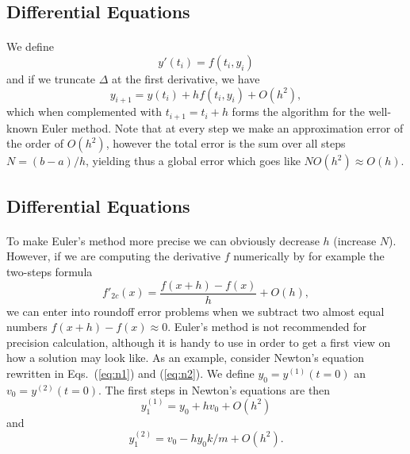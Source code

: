 \documentclass[%
oneside,                 %
final,                   %
10pt]{article}
\begin{document}
\subsection{Differential Equations}

\paragraph{}
We define 
\begin{equation}
  y'(t_i)=f(t_i,y_i)   
\end{equation}
and if we truncate $\Delta$ at the first derivative, we have
\begin{equation}
   y_{i+1}=y(t_i) + hf(t_i,y_i) + O(h^2), \label{eq:euler}
\end{equation}
which when complemented with $t_{i+1}=t_i+h$ forms
the algorithm for the well-known Euler method. 
Note that at every step we make an approximation error
of the order of $O(h^2)$, however the total error is the sum over all
steps $N=(b-a)/h$, yielding thus a global error which goes like
$NO(h^2)\approx O(h)$.



\subsection{Differential Equations}

\paragraph{}
To make Euler's method more precise we can obviously
decrease $h$ (increase $N$). However, if we are computing the 
derivative $f$ numerically  
by for example the two-steps formula
\[
    f'_{2c}(x)= \frac{f(x+h)-f(x)}{h}+O(h),
\]
we can enter into roundoff error problems when we subtract 
two almost equal numbers $f(x+h)-f(x)\approx 0$. 
Euler's method is not recommended for precision calculation,
although it is handy to use in order to get a first
view on how a solution may look like. As an example,
consider Newton's equation rewritten in Eqs.~(\ref{eq:n1}) and (\ref{eq:n2}). We define $y_0=y^{(1)}(t=0)$
an $v_0=y^{(2)}(t=0)$. The first steps in Newton's equations
are then
\begin{equation} 
   y^{(1)}_1=y_0+hv_0+O(h^2)
\end{equation}
and 
\begin{equation}
      y^{(2)}_1=v_0-hy_0k/m+O(h^2).
\end{equation}
\end{document}
